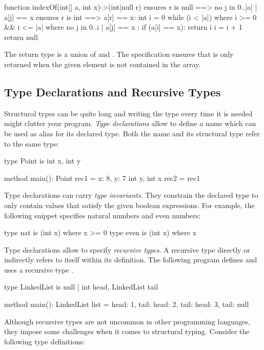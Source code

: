 \begin{whileycode}
function indexOf(int[] a, int x)->(int|null r)
ensures r is null ==> no { j in 0..|a| | a[j] == x }
ensures r is int  ==> a[r] == x:
	int i = 0
	while (i < |a|)
	where i >= 0 && i <= |a|
	where no { j in 0..i | a[j] == x }:
		if (a[i] == x):
			return i
		i = i + 1
	return null
\end{whileycode}

The return type is a union of  and .
The specification ensures that  is only returned when the given element is not contained in the array.


\subsection{Type Declarations and Recursive Types}

Structural types can be quite long and writing the type every time it is needed might clutter your program.
\emph{Type declarations} allow to define a name which can be used as alias for its declared type.
Both the name and its structural type refer to the same type:
\begin{whileycode}
type Point is {int x, int y}

method main():
	Point rec1 = {x: 8, y: 7}
	{int y, int x} rec2 = rec1
\end{whileycode}

Type declarations can carry \emph{type invariants}.
They constrain the declared type to only contain values that satisfy the given boolean expressions.
For example, the following snippet specifies natural numbers and even numbers:
\begin{whileycode}
type nat  is (int x) where x >= 0
type even is (int x) where x %
\end{whileycode}

Type declarations allow to specify \emph{recursive types}.
A recursive type directly or indirectly refers to itself within its definition.
The following program defines and uses a recursive type .

\begin{whileycode}
type LinkedList is null | {int head, LinkedList tail}

method main():
	LinkedList list =
	    {head: 1, tail: {head: 2, tail: {head: 3, tail: null}}}
\end{whileycode}

Although recursive types are not uncommon in other programming languages, they impose some challenges when it comes to structural typing.
Consider the following type definitions:

